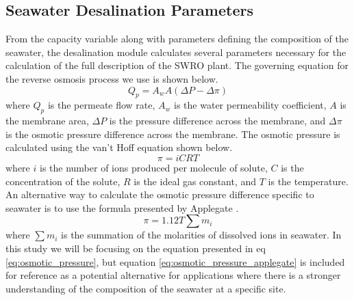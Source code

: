 \documentclass[twocolumn,10pt]{asme2e}
\begin{document}

\subsection{Seawater Desalination Parameters}
From the capacity variable along with parameters defining the composition of the seawater, the desalination module calculates several parameters necessary for the calculation of the full description of the SWRO plant. The governing equation for the reverse osmosis process we use is shown below.
\begin{equation}
    \label{eq:ro}
    Q_p = A_w A (\Delta P - \Delta \pi)
\end{equation}
where $Q_p$ is the permeate flow rate, $A_w$ is the water permeability coefficient, $A$ is the membrane area, $\Delta P$ is the pressure difference across the membrane, and $\Delta \pi$ is the osmotic pressure difference across the membrane. The osmotic pressure is calculated using the van't Hoff equation shown below.
\begin{equation}
    \label{eq:osmotic_pressure}
    \pi = iCRT
\end{equation}
where $i$ is the number of ions produced per molecule of solute, $C$ is the concentration of the solute, $R$ is the ideal gas constant, and $T$ is the temperature. An alternative way to calculate the osmotic pressure difference specific to seawater is to use the formula presented by Applegate \cite{separationprocesses}.
\begin{equation}
    \label{eq:osmotic_pressure_applegate}
    \pi = 1.12 T \sum m_i
\end{equation}
where $\sum m_i$ is the summation of the molarities of dissolved ions in seawater. In this study we will be focusing on the equation presented in eq \ref{eq:osmotic_pressure}, but equation \ref{eq:osmotic_pressure_applegate} is included for reference as a potential alternative for applications where there is a stronger understanding of the composition of the seawater at a specific site. 
\end{document}
